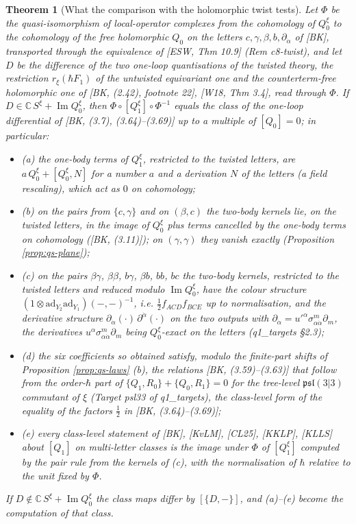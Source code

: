 \documentclass[11pt]{article}
\numberwithin{equation}{section}
\theoremstyle{plain}
\newtheorem{theorem}{Theorem}[section]
\theoremstyle{definition}
\begin{document}
\begin{theorem}[What the comparison with the holomorphic twist tests]
\label{thm:qs-twistcheck}
Let $\Phi$ be the quasi-isomorphism of local-operator complexes from the cohomology of $Q^\xi_0$ to the cohomology of the free holomorphic $Q_0$ on the letters $c,\gamma,\beta,b,\partial_{\dot\alpha}$ of [BK], transported through the equivalence of [ESW, Thm 10.9] (Rem c8-twist), and let $D$ be the difference of the two one-loop quantisations of the twisted theory, the restriction $r_\xi(\hbar F_1)$ of the untwisted equivariant one and the counterterm-free holomorphic one of [BK, (2.42), footnote 22], [W18, Thm 3.4], read through $\Phi$. If $D\in\mathbb C\,S^\xi+\operatorname{Im}Q^\xi_0$, then $\Phi\circ[Q^\xi_1]\circ\Phi^{-1}$ equals the class of the one-loop differential of [BK, (3.7), (3.64)--(3.69)] up to a multiple of $[Q_0]=0$; in particular:
\begin{itemize}
\item (a) the one-body terms of $Q^\xi_1$, restricted to the twisted letters, are $a\,Q^\xi_0+[Q^\xi_0,N]$ for a number $a$ and a derivation $N$ of the letters (a field rescaling), which act as $0$ on cohomology;
\item (b) on the pairs from $\{c,\gamma\}$ and on $(\beta,c)$ the two-body kernels lie, on the twisted letters, in the image of $Q^\xi_0$ plus terms cancelled by the one-body terms on cohomology ([BK, (3.11)]); on $(\gamma,\gamma)$ they vanish exactly (Proposition \ref{prop:qs-plane});
\item (c) on the pairs $\beta\gamma$, $\beta\beta$, $b\gamma$, $\beta b$, $bb$, $bc$ the two-body kernels, restricted to the twisted letters and reduced modulo $\operatorname{Im}Q^\xi_0$, have the colour structure $(1\otimes\mathrm{ad}_{Y_2}\mathrm{ad}_{Y_1})(-,-)^{-1}$, i.e. $\tfrac12f_{ACD}f_{BCE}$ up to normalisation, and the derivative structure $\partial_{\dot\alpha}(\cdot)\,\partial^{\dot\alpha}(\cdot)$ on the two outputs with $\partial_{\dot\alpha}=u'^\alpha\sigma^m_{\alpha\dot\alpha}\partial_m$, the derivatives $u^\alpha\sigma^m_{\alpha\dot\alpha}\partial_m$ being $Q^\xi_0$-exact on the letters (q1\_targets §2.3);
\item (d) the six coefficients so obtained satisfy, modulo the finite-part shifts of Proposition \ref{prop:qs-laws} (b), the relations [BK, (3.59)--(3.63)] that follow from the order-$\hbar$ part of $\{Q_1,R_0\}+\{Q_0,R_1\}=0$ for the tree-level $\mathfrak{psl}(3|3)$ commutant of $\xi$ (Target psl33 of q1\_targets), the class-level form of the equality of the factors $\tfrac12$ in [BK, (3.64)--(3.69)];
\item (e) every class-level statement of [BK], [KvLM], [CL25], [KKLP], [KLLS] about $[Q_1]$ on multi-letter classes is the image under $\Phi$ of $[Q^\xi_1]$ computed by the pair rule from the kernels of (c), with the normalisation of $\hbar$ relative to the unit fixed by $\Phi$.
\end{itemize}
If $D\notin\mathbb C\,S^\xi+\operatorname{Im}Q^\xi_0$ the class maps differ by $[\{D,-\}]$, and (a)--(e) become the computation of that class.
\end{theorem}
\end{document}
